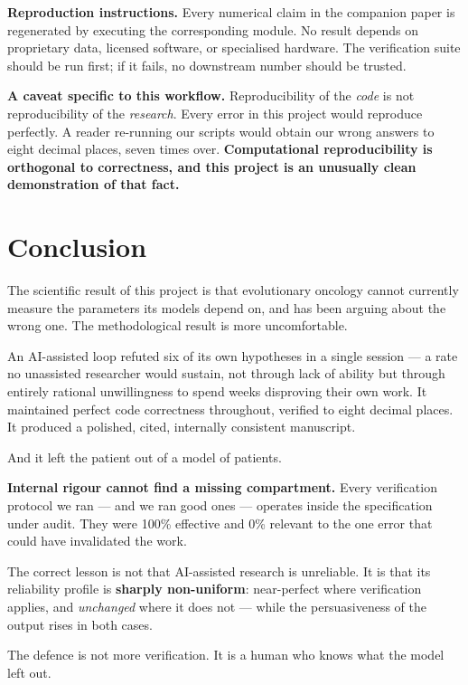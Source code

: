 \documentclass[11pt,a4paper]{article}
\begin{document}
\textbf{Reproduction instructions.} Every numerical claim in the companion paper is
regenerated by executing the corresponding module. No result depends on proprietary
data, licensed software, or specialised hardware. The verification suite should be run
first; if it fails, no downstream number should be trusted.

\textbf{A caveat specific to this workflow.} Reproducibility of the \emph{code} is not
reproducibility of the \emph{research}. Every error in this project would reproduce
perfectly. A reader re-running our scripts would obtain our wrong answers to eight
decimal places, seven times over. \textbf{Computational reproducibility is orthogonal to
correctness, and this project is an unusually clean demonstration of that fact.}

\section{Conclusion}

The scientific result of this project is that evolutionary oncology cannot currently
measure the parameters its models depend on, and has been arguing about the wrong one.
The methodological result is more uncomfortable.

An AI-assisted loop refuted six of its own hypotheses in a single session --- a rate no
unassisted researcher would sustain, not through lack of ability but through entirely
rational unwillingness to spend weeks disproving their own work. It maintained perfect
code correctness throughout, verified to eight decimal places. It produced a polished,
cited, internally consistent manuscript.

And it left the patient out of a model of patients.

\begin{tcolorbox}[keybox]
\textbf{Internal rigour cannot find a missing compartment.} Every verification protocol
we ran --- and we ran good ones --- operates inside the specification under audit. They
were 100\% effective and 0\% relevant to the one error that could have invalidated the
work.

The correct lesson is not that AI-assisted research is unreliable. It is that its
reliability profile is \textbf{sharply non-uniform}: near-perfect where verification
applies, and \emph{unchanged} where it does not --- while the persuasiveness of the
output rises in both cases.

The defence is not more verification. It is a human who knows what the model left out.
\end{tcolorbox}
\end{document}
